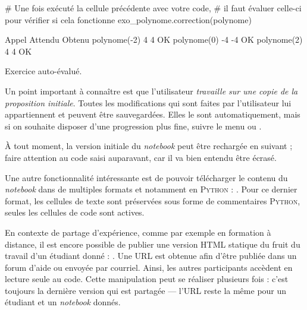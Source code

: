\begin{jazzfigure}
\vspace{2pt}
\begin{nbjupyterin}{4}
# Une fois exécuté la cellule précédente avec votre code,
# il faut évaluer celle-ci pour vérifier si cela fonctionne
exo_polynome.correction(polynome)
\end{nbjupyterin}
\begin{nbjupyterout}[colback=pynbcodetruebgcolor]{4}
Appel          Attendu      Obtenu
polynome(-2)     4             4      OK
polynome(0)     -4            -4      OK
polynome(2)      4             4      OK
\end{nbjupyterout}
\vspace{2pt}
\caption{\label{fig:X.6}Exercice auto-évalué.}
\end{jazzfigure}


Un point important à connaître est que l'utilisateur \emph{travaille sur une copie de la proposition initiale}. Toutes les modifications qui sont faites par l'utilisateur lui appartiennent et peuvent être sauvegardées. Elles le sont automatiquement, mais si on souhaite disposer d'une progression plus fine, suivre le menu  ou .

À tout moment, la version initiale du \textit{notebook} peut être rechargée en suivant  ; faire attention au code saisi auparavant, car il va bien entendu être écrasé.

Une autre fonctionnalité intéressante est de pouvoir télécharger le contenu du \textit{notebook} dans de multiples formats et notamment en \textsc{Python} : . Pour ce dernier format, les cellules de texte sont préservées sous forme de commentaires \textsc{Python}, seules les cellules de code sont actives.

En contexte de partage d'expérience, comme par exemple en formation à distance, il est encore possible de publier une version HTML statique du fruit du travail d'un étudiant donné : . Une URL est obtenue afin d'être publiée dans un forum d'aide ou envoyée par courriel. Ainsi, les autres participants accèdent en lecture seule au code. Cette manipulation peut se réaliser plusieurs fois : c'est toujours la dernière version qui est partagée --- l'URL reste la même pour un étudiant et un \textit{notebook} donnés.

